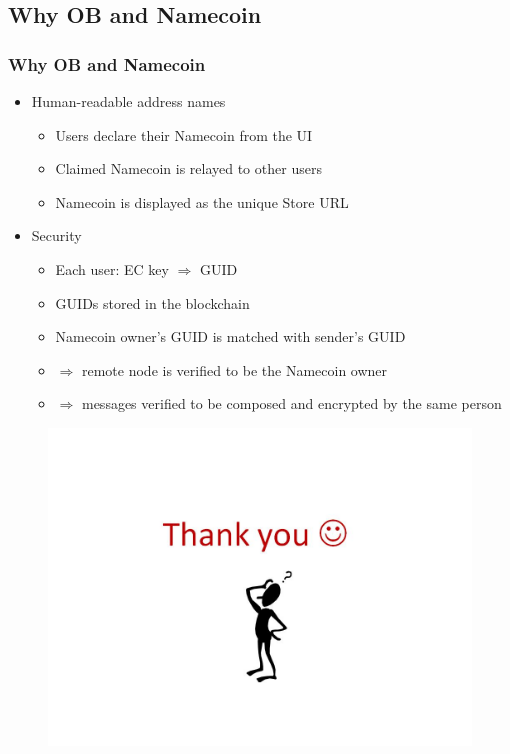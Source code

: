 \documentclass{beamer}
\begin{document}
\subsection{Why OB and Namecoin}
\begin{frame}
\frametitle{Why OB and Namecoin}
\begin{itemize}
\item Human-readable address names \pause
\begin{itemize}
\item Users declare their Namecoin from the UI
\item Claimed Namecoin is relayed to other users
\item Namecoin is displayed as the unique Store URL \pause
\end{itemize}
\item Security \pause
\begin{itemize}
\item Each user: EC key $\Rightarrow$ GUID 
\item GUIDs stored in the blockchain 
\item Namecoin owner's GUID is matched with sender's GUID \pause
\item $\Rightarrow$ remote node is verified to be the Namecoin owner \pause
\item $\Rightarrow$ messages verified to be composed and encrypted by the same person
\end{itemize}
\end{itemize}
\end{frame}
\begin{frame}
\begin{figure}[H]
\centering
\includegraphics[width=1.00\textwidth]{screenshots/Thanks.jpg}
\end{figure}
\end{frame}
\end{document}

